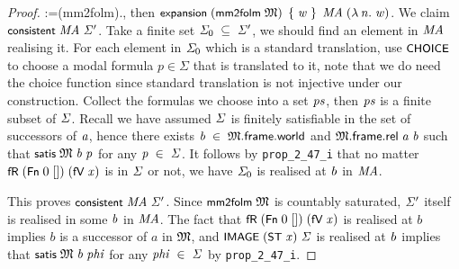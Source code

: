 \documentclass[letterpaper]{article}
\renewcommand{\HOLConst}[1]{{\textsf{\upshape\small #1}}}
\renewcommand{\HOLinline}[1]{\ensuremath{#1}}
\begin{document}
\begin{proof}
\;\;\;\;\;\;\;:=\;(\HOLConst{mm2folm}\;).\HOLTokenRightrec{}, then \HOLinline{\HOLConst{expansion}\;(\HOLConst{mm2folm}\;\HOLFreeVar{\ensuremath{\mathfrak{M}}})\;\HOLTokenLeftbrace{}\HOLFreeVar{w}\HOLTokenRightbrace{}\;\HOLFreeVar{MA}\;(\HOLTokenLambda{}\HOLBoundVar{n}.\;\HOLFreeVar{w})}. We claim \HOLinline{\HOLConst{consistent}\;\HOLFreeVar{MA}\;\HOLFreeVar{\ensuremath{\Sigma}\sp{\prime}}}. Take a finite set \HOLinline{\HOLFreeVar{\ensuremath{\Sigma}\sb{\mathrm{0}}}\;\HOLSymConst{\HOLTokenSubset{}}\;\HOLFreeVar{\ensuremath{\Sigma}\sp{\prime}}}, we should find an element in \HOLinline{\HOLFreeVar{MA}} realising it. For each element in \HOLinline{\HOLFreeVar{\ensuremath{\Sigma}\sb{\mathrm{0}}}} which is a standard translation, use \HOLinline{\HOLConst{CHOICE}} to choose a modal formula $p\in \Sigma$ that is translated to it, note that we do need the choice function since standard translation is not injective under our construction. Collect the formulas we choose into a set \HOLinline{\HOLFreeVar{ps}}, then \HOLinline{\HOLFreeVar{ps}} is a finite subset of \HOLinline{\HOLFreeVar{\ensuremath{\Sigma}}}. Recall we have assumed \HOLinline{\HOLFreeVar{\ensuremath{\Sigma}}} is finitely satisfiable in the set of successors of \HOLinline{\HOLFreeVar{a}}, hence there exists \HOLinline{\HOLFreeVar{b}\;\HOLSymConst{\HOLTokenIn{}}\;\HOLFreeVar{\ensuremath{\mathfrak{M}}}.\HOLFieldName{frame}.\HOLFieldName{world}} and \HOLinline{\HOLFreeVar{\ensuremath{\mathfrak{M}}}.\HOLFieldName{frame}.\HOLFieldName{rel}\;\HOLFreeVar{a}\;\HOLFreeVar{b}} such that \HOLinline{\HOLConst{satis}\;\HOLFreeVar{\ensuremath{\mathfrak{M}}}\;\HOLFreeVar{b}\;\HOLFreeVar{p}} for any \HOLinline{\HOLFreeVar{p}\;\HOLSymConst{\HOLTokenIn{}}\;\HOLFreeVar{\ensuremath{\Sigma}}}. It follows by \texttt{prop_2_47_i} that no matter \HOLinline{\HOLConst{fR}\;(\HOLConst{Fn}\;\HOLNumLit{0}\;[])\;(\HOLConst{fV}\;\HOLFreeVar{x})} is in \HOLinline{\HOLFreeVar{\ensuremath{\Sigma}}} or not, we have \HOLinline{\HOLFreeVar{\ensuremath{\Sigma}\sb{\mathrm{0}}}} is realised at \HOLinline{\HOLFreeVar{b}} in \HOLinline{\HOLFreeVar{MA}}.

This proves \HOLinline{\HOLConst{consistent}\;\HOLFreeVar{MA}\;\HOLFreeVar{\ensuremath{\Sigma}\sp{\prime}}}. Since \HOLinline{\HOLConst{mm2folm}\;\HOLFreeVar{\ensuremath{\mathfrak{M}}}} is countably saturated, \HOLinline{\HOLFreeVar{\ensuremath{\Sigma}\sp{\prime}}} itself is realised in some \HOLinline{\HOLFreeVar{b}} in \HOLinline{\HOLFreeVar{MA}}. The fact that \HOLinline{\HOLConst{fR}\;(\HOLConst{Fn}\;\HOLNumLit{0}\;[])\;(\HOLConst{fV}\;\HOLFreeVar{x})} is realised at $b$ implies $b$ is a successor of $a$ in \HOLinline{\HOLFreeVar{\ensuremath{\mathfrak{M}}}}, and \HOLinline{\HOLConst{IMAGE}\;(\HOLConst{ST}\;\HOLFreeVar{x})\;\HOLFreeVar{\ensuremath{\Sigma}}} is realised at \HOLinline{\HOLFreeVar{b}} implies that \HOLinline{\HOLConst{satis}\;\HOLFreeVar{\ensuremath{\mathfrak{M}}}\;\HOLFreeVar{b}\;\HOLFreeVar{phi}} for any \HOLinline{\HOLFreeVar{phi}\;\HOLSymConst{\HOLTokenIn{}}\;\HOLFreeVar{\ensuremath{\Sigma}}} by \texttt{prop_2_47_i}.
\end{proof}
\end{document}
